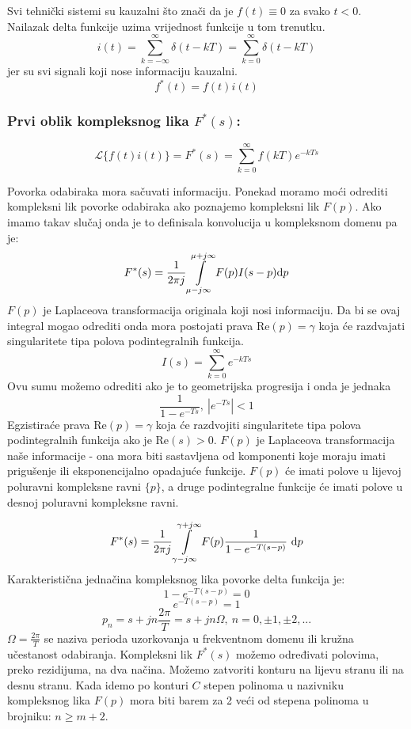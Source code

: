 \documentclass{article}
\newcommand{\suma}{\sum\limits}
\newenvironment{defquote}
	{\begin{center}\begin{minipage}{0.9\linewidth}\begin{mdframed}[linewidth=1.2pt]}
		{\end{mdframed}\end{minipage}\end{center}}
\begin{document}
	Svi tehnički sistemi su kauzalni što znači da je $f(t) \equiv 0$ za svako $t<0$. Nailazak delta funkcije uzima vrijednost funkcije u tom trenutku.
	$$i(t) = \suma_{k=-\infty}^\infty \delta(t-kT) = \suma_{k=0}^\infty \delta(t-kT)$$ jer su svi signali koji nose informaciju kauzalni.
	$$f^*(t) = f(t)i(t)$$
	\begin{defquote}
		\subsubsection*{Prvi oblik kompleksnog lika $F^*(s)$:}
		$$\mathcal{L}\{f(t)i(t)\} = F^*(s) = \suma_{k=0}^\infty f(kT) e^{-kTs}$$
	\end{defquote}

	Povorka odabiraka mora sačuvati informaciju. Ponekad moramo moći odrediti kompleksni lik povorke odabiraka ako poznajemo kompleksni lik $F(p)$. Ako imamo takav slučaj onda je to definisala konvolucija u kompleksnom domenu pa je:
	$$F^*(s) = \frac{1}{2\pi j} \int\limits_{\mu - j\infty}^{\mu+j\infty} F(p)I(s-p)\text dp$$
	$F(p)$ je Laplaceova transformacija originala koji nosi informaciju. Da bi se ovaj integral mogao odrediti onda mora postojati prava $\text{Re}(p) = \gamma$ koja će razdvajati singularitete tipa polova podintegralnih funkcija.
	$$I(s) = \sum_{k=0}^\infty e^{-kTs}$$
	Ovu sumu možemo odrediti ako je to geometrijska progresija i onda je jednaka $$\frac{1}{1-e^{-Ts}}, \ |e^{-Ts}|<1$$
	Egzistiraće prava Re$(p)=\gamma$ koja će razdvojiti singularitete tipa polova podintegralnih funkcija ako je Re$(s)>0$. $F(p)$ je Laplaceova transformacija naše informacije - ona mora biti sastavljena od komponenti koje moraju imati prigušenje ili eksponencijalno opadajuće funkcije. $F(p)$ će imati polove u lijevoj poluravni kompleksne ravni $\{p\}$, a druge podintegralne funkcije će imati polove u desnoj poluravni kompleksne ravni. 
	\begin{figure}[] %
		
	\end{figure}
	$$F^*(s) = \frac{1}{2\pi j} \int\limits_{\gamma-j\infty}^{\gamma+j\infty} F(p) \frac{1}{1-e^{-T(s-p)}}\ \text dp$$
	Karakteristična jednačina kompleksnog lika povorke delta funkcija je:
	$$1-e^{-T(s-p)} = 0$$
	$$e^{-T(s-p)}=1$$
	$$p_n = s+jn\frac{2\pi}{T} = s+jn\Omega, \ n=0,\pm1,\pm2,...$$ 
	$\Omega = \frac{2\pi}{T}$ se naziva perioda uzorkovanja u frekventnom domenu ili kružna učestanost odabiranja. Kompleksni lik $F^*(s)$ možemo određivati polovima, preko rezidijuma, na dva načina. Možemo zatvoriti konturu na lijevu stranu ili na desnu stranu. Kada idemo po konturi $C$ stepen polinoma u nazivniku kompleksnog lika $F(p)$ mora biti barem za 2 veći od stepena polinoma u brojniku: $n\ge m+2$.
\end{document}
